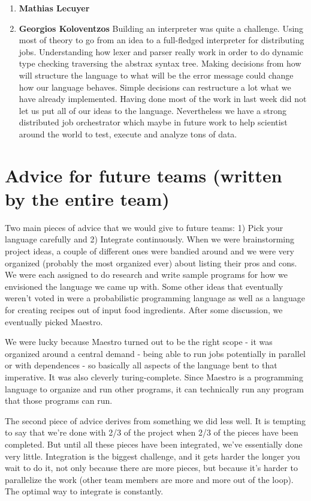 \begin{enumerate}
\item \textbf{Mathias Lecuyer}

\item \textbf{Georgios Koloventzos}
Building an interpreter was quite a challenge. Using most of theory to go from an idea to a full-fledged interpreter
for distributing jobs. Understanding how lexer and parser really work in order to do dynamic type checking traversing
the abstrax syntax tree. Making decisions from how will structure the language to what will be the error message could change
how our language behaves. Simple decisions can restructure a lot what we have already implemented. Having done most of the work
in last week did not let us put all of our ideas to the language.
Nevertheless we have a strong distributed job orchestrator which maybe in future work to help scientist around the world
to test, execute and analyze tons of data.
\end{enumerate}
\section{Advice for future teams (written by the entire team)}
Two main pieces of advice that we would give to future teams: 1) Pick your language carefully and 2) Integrate continuously. When we were brainstorming project ideas, a couple of different ones were bandied around and we were very organized (probably the most organized ever) about listing their pros and cons. We were each assigned to do research and write sample programs for how we envisioned the language we came up with. Some other ideas that eventually weren't voted in were a probabilistic programming language as well as a language for creating recipes out of input food ingredients. After some discussion, we eventually picked Maestro.

We were lucky because Maestro turned out to be the right scope - it was organized around a central demand - being able to run jobs potentially in parallel or with dependences - so basically all aspects of the language bent to that imperative. It was also cleverly turing-complete. Since Maestro is a programming language to organize and run other programs, it can technically run any program that those programs can run.

The second piece of advice derives from something we did less well. It is tempting to say that we're done with 2/3 of the project when 2/3 of the pieces have been completed. But until all these pieces have been integrated, we've essentially done very little. Integration is the biggest challenge, and it gets harder the longer you wait to do it, not only because there are more pieces, but because it's harder to parallelize the work (other team members are more and more out of the loop). The optimal way to integrate is constantly. 
    
